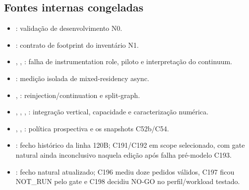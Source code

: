 \subsection{Fontes internas congeladas}
\begin{itemize}
\item {}: validação de desenvolvimento N0.
\item {}: contrato de footprint do inventário N1.
\item {}, , : falha de instrumentation role, piloto e interpretação do continuum.
\item {}: medição isolada de mixed-residency async.
\item {}, : reinjection/continuation e split-graph.
\item {}, , , : integração vertical, capacidade e caracterização numérica.
\item {}, , : política prospectiva e os snapshots C52b/C54.
\item {}: fecho histórico da linha 120B; C191/C192 em scope selecionado, com gate natural ainda inconclusivo naquela edição após falha pré-modelo C193.
\item {}: fecho natural atualizado; C196 mediu doze pedidos válidos, C197 ficou NOT\_RUN pelo gate e C198 decidiu NO-GO no perfil/workload testado.
\end{itemize}
